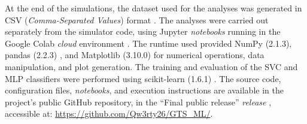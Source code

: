 \noindent At the end of the simulations, the dataset used for the analyses was generated in CSV (\emph{Comma-Separated Values}) format \cite{shafranovich2005rfc4180}. The analyses were carried out separately from the simulator code, using Jupyter \emph{notebooks} \cite{kluyver2016jupyter} running in the Google Colab \emph{cloud} environment \cite{googlecolab}. The runtime used provided NumPy (2.1.3), pandas (2.2.3) \cite{mckinney2010data}, and Matplotlib (3.10.0) \cite{hunter2007matplotlib} for numerical operations, data manipulation, and plot generation. The training and evaluation of the SVC and MLP classifiers were performed using scikit-learn (1.6.1) \cite{pedregosa2011scikit}.
\newline The source code, configuration files, \emph{notebooks}, and execution instructions are available in the project's public GitHub repository, in the ``Final public release'' \emph{release} \cite{asaro2026gtsml}, accessible at: \url{https://github.com/Qw3rty26/GTS_ML/}.%
